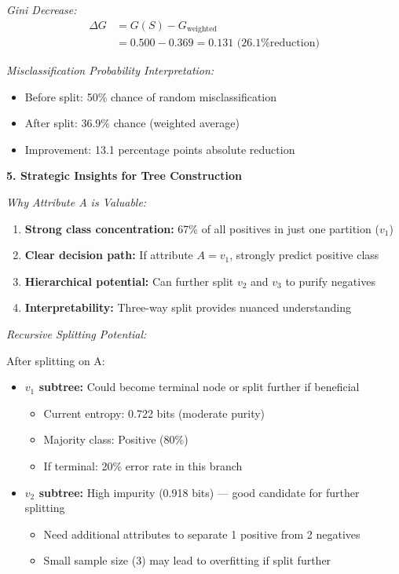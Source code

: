 \documentclass[12pt]{article}
\begin{document}
\begin{explanation}
\textit{Gini Decrease:}
\begin{align*}
\Delta G &= G(S) - G_{\text{weighted}} \\
&= 0.500 - 0.369 = 0.131 \text{ (26.1\% reduction)}
\end{align*}

\textit{Misclassification Probability Interpretation:}
\begin{itemize}
    \item Before split: 50\% chance of random misclassification
    \item After split: 36.9\% chance (weighted average)
    \item Improvement: 13.1 percentage points absolute reduction
\end{itemize}

\textbf{5. Strategic Insights for Tree Construction}

\textit{Why Attribute A is Valuable:}

\begin{enumerate}
    \item \textbf{Strong class concentration:} 67\% of all positives in just one partition ($v_1$)
    \item \textbf{Clear decision path:} If attribute $A = v_1$, strongly predict positive class
    \item \textbf{Hierarchical potential:} Can further split $v_2$ and $v_3$ to purify negatives
    \item \textbf{Interpretability:} Three-way split provides nuanced understanding
\end{enumerate}

\textit{Recursive Splitting Potential:}

After splitting on A:
\begin{itemize}
    \item \textbf{$v_1$ subtree:} Could become terminal node or split further if beneficial
    \begin{itemize}
        \item Current entropy: 0.722 bits (moderate purity)
        \item Majority class: Positive (80\%)
        \item If terminal: 20\% error rate in this branch
    \end{itemize}

    \item \textbf{$v_2$ subtree:} High impurity (0.918 bits) — good candidate for further splitting
    \begin{itemize}
        \item Need additional attributes to separate 1 positive from 2 negatives
        \item Small sample size (3) may lead to overfitting if split further
    \end{itemize}


\end{itemize}
\end{explanation}
\end{document}
